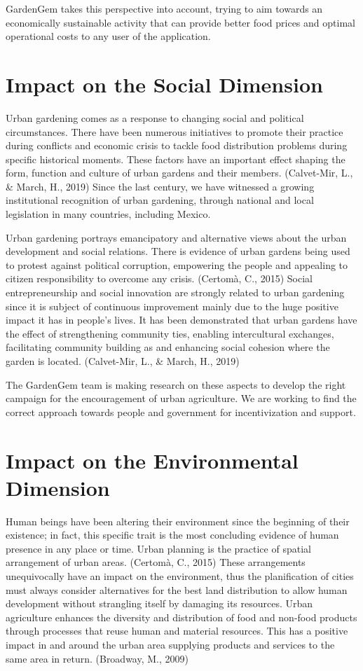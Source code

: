 GardenGem takes this perspective into account, trying to aim towards an economically sustainable activity that can provide better food prices and optimal operational costs to any user of the application.

\section{Impact on the Social Dimension}

Urban gardening comes as a response to changing social and political circumstances. There have been numerous initiatives to promote their practice during conflicts and economic crisis to tackle food distribution problems during specific historical moments. These factors have an important effect shaping the form, function and culture of urban gardens and their members. (Calvet-Mir, L., \& March, H., 2019) Since the last century, we have witnessed a growing institutional recognition of urban gardening, through national and local legislation in many countries, including Mexico.

Urban gardening portrays emancipatory and alternative views about the urban development and social relations. There is evidence of urban gardens being used to protest against political corruption, empowering the people and appealing to citizen responsibility to overcome any crisis. (Certomà, C., 2015) Social entrepreneurship and social innovation are strongly related to urban gardening since it is subject of continuous improvement mainly due to the huge positive impact it has in people’s lives.
It has been demonstrated that urban gardens have the effect of strengthening community ties, enabling intercultural exchanges, facilitating community building as and enhancing social cohesion where the garden is located. (Calvet-Mir, L., \& March, H., 2019)

The GardenGem team is making research on these aspects to develop the right campaign for the encouragement of urban agriculture. We are working to find the correct approach towards people and government for incentivization and support.

\section{Impact on the Environmental Dimension}

Human beings have been altering their environment since the beginning of their existence; in fact, this specific trait is the most concluding evidence of human presence in any place or time. Urban planning is the practice of spatial arrangement of urban areas. (Certomà, C., 2015) These arrangements unequivocally have an impact on the environment, thus the planification of cities must always consider alternatives for the best land distribution to allow human development without strangling itself by damaging its resources. Urban agriculture enhances the diversity and distribution of food and non-food products through processes that reuse human and material resources. This has a positive impact in and around the urban area supplying products and services to the same area in return. (Broadway, M., 2009)

